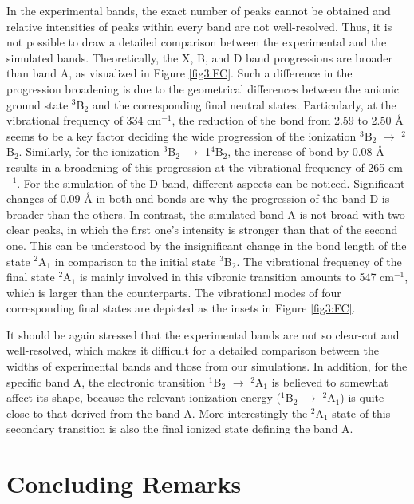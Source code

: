 \begin{refsection}
In the experimental bands, the exact number of peaks cannot be obtained and relative intensities of peaks within every band are not well-resolved. Thus, it is not possible to draw a detailed comparison between the experimental and the simulated bands. Theoretically, the X, B, and D band progressions are broader than band A, as visualized in Figure \ref{fig3:FC}. Such a difference in the progression broadening is due to the geometrical differences between the anionic ground state $^3$B$_2$ and the corresponding final neutral states. Particularly, at the vibrational frequency of 334 cm$^{-1}$, the reduction of the  bond from 2.59 to 2.50 \AA{} seems to be a key factor deciding the wide progression of the ionization $^3$B$_2$ $\longrightarrow$ $^2$B$_2$. Similarly, for the ionization $^3$B$_2$ $\longrightarrow$ 1$^4$B$_2$, the increase of  bond by 0.08 \AA{} results in a broadening of this progression at the vibrational frequency of 265 cm$^{-1}$. For the simulation of the D band, different aspects can be noticed. Significant changes of 0.09 \AA{} in both  and  bonds are why the progression of the band D is broader than the others. In contrast, the simulated band A is not broad with two clear peaks, in which the first one’s intensity is stronger than that of the second one. This can be understood by the insignificant change in the  bond length of the state $^2$A$_1$ in comparison to the initial state $^3$B$_2$. The vibrational frequency of the final state $^2$A$_1$ is mainly involved in this vibronic transition amounts to 547 cm$^{-1}$, which is larger than the counterparts. The vibrational modes of four corresponding final states are depicted as the insets in Figure \ref{fig3:FC}. 



It should be again stressed that the experimental bands are not so clear-cut and well-resolved, which makes it difficult for a detailed comparison between the widths of experimental bands and those from our simulations. In addition, for the specific band A, the electronic transition $^1$B$_2$ $\longrightarrow$ $^2$A$_1$ is believed to somewhat affect its shape, because the relevant ionization energy ($^1$B$_2$ $\longrightarrow$ $^2$A$_1$) is quite close to that derived from the band A. More interestingly the $^2$A$_1$ state of this secondary transition is also the final ionized state defining the band A. 



\section{Concluding Remarks}



\end{refsection}
